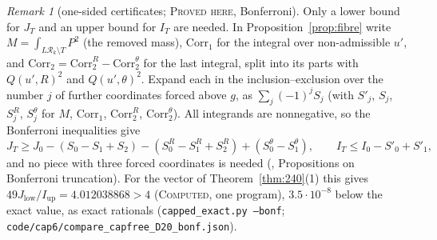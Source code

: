 \documentclass[11pt]{amsart}
\theoremstyle{definition}
\theoremstyle{remark}
\newtheorem{remark}[theorem]{Remark}
\newcommand{\lbl}[1]{\textup{\textsc{#1}}}
\newcommand{\R}{\mathcal{R}}
\begin{document}
\begin{remark}[one-sided certificates; \lbl{Proved here}, Bonferroni]\label{rem:bonf}
Only a lower bound for $J_T$ and an upper bound for $I_T$ are needed. In
Proposition~\ref{prop:fibre} write $M=\int_{L\R_k\setminus T}P^2$ (the removed
mass), $\mathrm{Corr}_1$ for the integral over non-admissible $u'$, and
$\mathrm{Corr}_2=\mathrm{Corr}_2^R-\mathrm{Corr}_2^\theta$ for the last
integral, split into its parts with $Q(u',R)^2$ and $Q(u',\theta)^2$. Expand
each in the inclusion--exclusion over the number $j$ of further coordinates
forced above $g$, as $\sum_j(-1)^jS_j$ (with $S'_j$, $S_j$, $S^R_j$,
$S^\theta_j$ for $M$, $\mathrm{Corr}_1$, $\mathrm{Corr}_2^R$,
$\mathrm{Corr}_2^\theta$). All integrands are nonnegative, so the Bonferroni
inequalities give
\[
J_T\ge J_0-(S_0-S_1+S_2)-(S^R_0-S^R_1+S^R_2)+(S^\theta_0-S^\theta_1),\qquad
I_T\le I_0-S'_0+S'_1,
\]
and no piece with three forced coordinates is needed (\cite{Kim26},
Propositions on Bonferroni truncation). For the vector of
Theorem~\ref{thm:240}(1) this gives $49J_{\mathrm{low}}/I_{\mathrm{up}}=4.012038868>4$
(\lbl{Computed}, one program),
$3.5\cdot10^{-8}$ below the exact value, as exact rationals
(\texttt{capped\_exact.py --bonf};
\texttt{code/}\allowbreak\texttt{cap6/}\allowbreak\texttt{compare\_capfree\_D20\_bonf.json}).
\end{remark}
\end{document}
